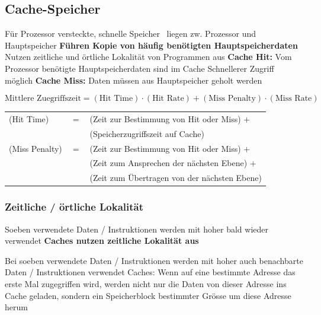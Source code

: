 \subsection{Cache-Speicher}

\begin{outline}
    \1 Für Prozessor versteckte, schnelle Speicher \textrightarrow\ liegen zw. Prozessor und Hauptspeicher
    \1 \textbf{Führen Kopie von häufig benötigten Hauptspeicherdaten}
        \2 Nutzen zeitliche und örtliche Lokalität von Programmen aus
    \1 \textbf{Cache Hit:} Vom Prozessor benötigte Hauptspeicherdaten sind im Cache
        \2 Schnellerer Zugriff möglich
    \1 \textbf{Cache Miss:} Daten müssen aus Hauptspeicher geholt werden
 \end{outline}

 $$ \boxed{ \text{Mittlere Zuegriffszeit} = (\text{Hit Time}) \cdot (\text{Hit Rate}) + (\text{Miss Penalty}) \cdot (\text{Miss Rate}) } $$


 \begin{tabular}{l c l}
    (Hit Time)      & $=$   & (Zeit zur Bestimmung von Hit oder Miss) $+$   \\
                    &       & (Speicherzugriffszeit auf Cache)              \\
    (Miss Penalty)  & $=$   & (Zeit zur Bestimmung von Hit oder Miss) $+$   \\
                    &       & (Zeit zum Ansprechen der nächsten Ebene) $+$  \\
                    &       & (Zeit zum Übertragen von der nächsten Ebene)
 \end{tabular}      


\subsubsection{Zeitliche / örtliche Lokalität}


\begin{outline}
    \1 Soeben verwendete Daten / Instruktionen werden mit hoher  bald wieder verwendet
        \2 \textbf{Caches nutzen zeitliche Lokalität aus}
\end{outline}



\begin{outline}
    \1 Bei soeben verwendete Daten / Instruktionen werden mit hoher  auch benachbarte Daten / Instruktionen verwendet
        \2 Caches: Wenn auf eine bestimmte Adresse das erste Mal zugegriffen wird, werden nicht nur die Daten von dieser Adresse ins Cache 
            geladen, sondern ein Speicherblock bestimmter Grösse um diese Adresse herum
\end{outline}

